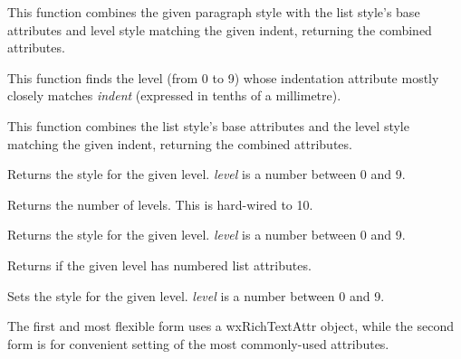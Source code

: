 
This function combines the given paragraph style with the list style's base attributes and level style matching the given indent, returning the combined attributes.

\label{wxrichtextliststyledefinitionfindlevelforindent}


This function finds the level (from 0 to 9) whose indentation attribute mostly closely matches {\it indent} (expressed in tenths of a millimetre).

\label{wxrichtextliststyledefinitioncombinewithparagraphstyle}


This function combines the list style's base attributes and the level style matching the given indent, returning the combined attributes.

\label{wxrichtextliststyledefinitiongetlevelattributes}


Returns the style for the given level. {\it level} is a number between 0 and 9.

\label{wxrichtextliststyledefinitiongetlevelcount}


Returns the number of levels. This is hard-wired to 10.

Returns the style for the given level. {\it level} is a number between 0 and 9.

\label{wxrichtextliststyledefinitionisnumbered}


Returns \true if the given level has numbered list attributes.

\label{wxrichtextliststyledefinitionsetlevelattributes}



Sets the style for the given level. {\it level} is a number between 0 and 9.

The first and most flexible form uses a wxRichTextAttr object, while the second form is for convenient setting of the most commonly-used attributes.

